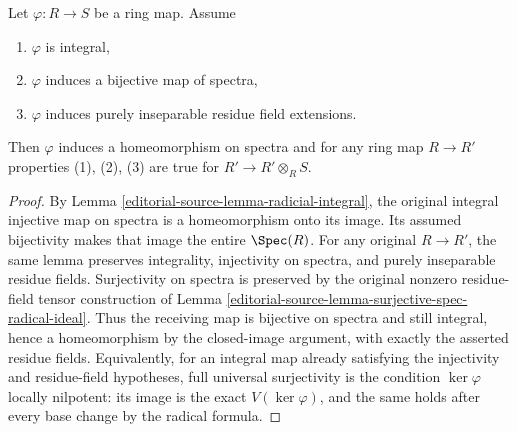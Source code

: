 \begin{lemma}
\label{editorial-source-lemma-radicial-integral-bijective}
Let $\varphi : R \to S$ be a ring map. Assume
\begin{enumerate}
\item $\varphi$ is integral,
\item $\varphi$ induces a bijective map of spectra,
\item $\varphi$ induces purely inseparable residue field extensions.
\end{enumerate}
Then $\varphi$ induces a homeomorphism on spectra and for any ring map
$R \to R'$ properties (1), (2), (3) are true for $R' \to R' \otimes_R S$.
\end{lemma}

\begin{proof}
By Lemma \ref{editorial-source-lemma-radicial-integral}, the
original integral injective map on spectra
is a homeomorphism onto its image.
Its assumed bijectivity makes that image
the entire $\Spec(R)$. For any original
$R\to R'$, the same lemma preserves
integrality, injectivity on spectra,
and purely inseparable residue fields.
Surjectivity on spectra is preserved
by the original nonzero residue-field
tensor construction of Lemma
\ref{editorial-source-lemma-surjective-spec-radical-ideal}.
Thus the receiving map is bijective
on spectra and still integral, hence
a homeomorphism by the closed-image
argument, with exactly the asserted
residue fields. Equivalently, for
an integral map already satisfying
the injectivity and residue-field
hypotheses, full universal surjectivity
is the condition $\ker\varphi$
locally nilpotent: its image is
the exact $V(\ker\varphi)$, and
the same holds after every base
change by the radical formula.
\end{proof}